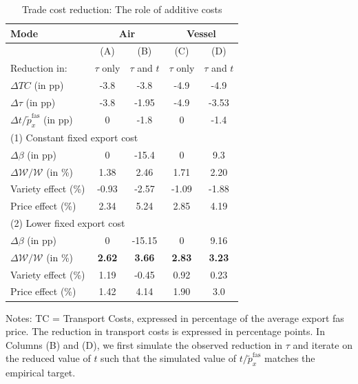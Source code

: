 \documentclass[a4paper,11pt]{article}
\begin{document}
\begin{table}[htbp]
  \centering
  \caption{Trade cost reduction: The role of additive costs} \label{tab:resultats_modele}
\begin{center}
\begin{tabular}{l||c|c||c|c}
\hline
Mode & \multicolumn{2}{|c||}{Air} & \multicolumn{2}{c}{Vessel} \\ \hline
& (A) & (B) & (C) & (D)  \\
Reduction in: & $\tau$ only & $\tau$ and $t$ &$\tau$ only & $\tau$ and $t$\\  \hline
$\Delta TC$ (in pp) &-3.8 &-3.8 &-4.9 &-4.9   \\
$\Delta \tau$ (in pp) & -3.8	&-1.95&-4.9&	-3.53	 \\
$\Delta t/\widetilde{p}_x^{\text{fas}}$ (in pp) & 0&	-1.8&	0&	-1.4\\ \hline
\multicolumn{4}{l}{(1) Constant fixed export cost} \\ \hline
$\Delta \beta$ (in pp) &0&-15.4&0&9.3 \\
$\Delta \mathcal{W}/\mathcal{W}$ (in \%) & 1.38&	2.46 & 1.71	&2.20 	 \\
\hspace{1em} Variety effect (\%)& -0.93 	&-2.57	&-1.09	& -1.88 \\
\hspace{1em} Price effect (\%)&2.34 &5.24	&2.85	& 4.19  \\
\hline
\multicolumn{4}{l}{(2) Lower fixed export cost} \\ \hline
$\Delta \beta$ (in pp) &0&-15.15&0&9.16 \\
$\Delta \mathcal{W}/\mathcal{W}$ (in \%) & 	\textbf{2.62}	&\textbf{3.66}	&	\textbf{2.83}&	\textbf{3.23 }  \\
\hspace{1em} Variety effect (\%)&1.19 &-0.45	&0.92	&0.23 \\
\hspace{1em} Price effect (\%)&	1.42 &	4.14&		 1.90&	3.0 \\ \hline \hline
\end{tabular}
\end{center}
{\parbox[l]{10cm}{ \vspace{4pt}\footnotesize{Notes: TC = Transport Costs, expressed in percentage of the average export fas price. The reduction in transport costs is expressed in percentage points. In Columns (B) and (D), we first simulate the observed reduction in $\tau$ and iterate on the reduced value of $t$ such that the simulated value of $t/\widetilde{p}_x^{\text{fas}}$ matches the empirical target.  }}}
\end{table}
\end{document}
